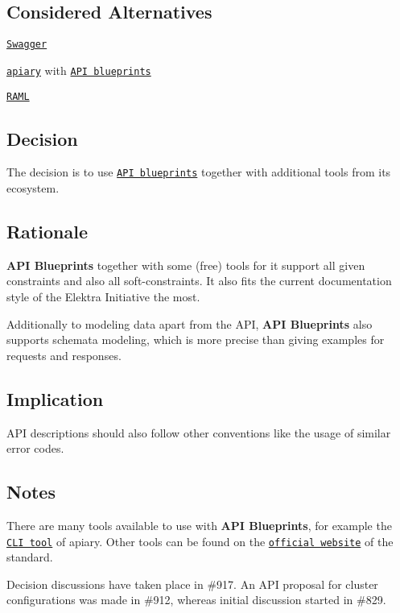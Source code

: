 \subsection*{Considered Alternatives}


\begin{DoxyItemize}
\item \href{http://swagger.io/}{\tt Swagger}
\item \href{https://apiary.io/}{\tt apiary} with \href{https://apiblueprint.org/}{\tt A\+PI blueprints}
\item \href{http://raml.org/}{\tt R\+A\+ML}
\end{DoxyItemize}

\subsection*{Decision}

The decision is to use \href{https://apiblueprint.org/}{\tt A\+PI blueprints} together with additional tools from its ecosystem.

\subsection*{Rationale}

{\bfseries A\+PI Blueprints} together with some (free) tools for it support all given constraints and also all soft-\/constraints. It also fits the current documentation style of the Elektra Initiative the most.

Additionally to modeling data apart from the A\+PI, {\bfseries A\+PI Blueprints} also supports schemata modeling, which is more precise than giving examples for requests and responses.

\subsection*{Implication}


\begin{DoxyItemize}
\item A\+PI descriptions should also follow other conventions like the usage of similar error codes.
\end{DoxyItemize}

\subsection*{Notes}

There are many tools available to use with {\bfseries A\+PI Blueprints}, for example the \href{https://github.com/apiaryio/apiary-client}{\tt C\+LI tool} of apiary. Other tools can be found on the \href{https://apiblueprint.org/tools.html}{\tt official website} of the standard.

Decision discussions have taken place in \#917. An A\+PI proposal for cluster configurations was made in \#912, whereas initial discussion started in \#829. 